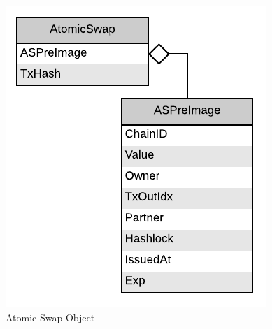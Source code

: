 \begin{figure}[H]
    \centering
    \includegraphics[scale=0.5]{figures/AtomicSwap_Object.pdf}
    \caption{Atomic Swap Object}
\end{figure}
